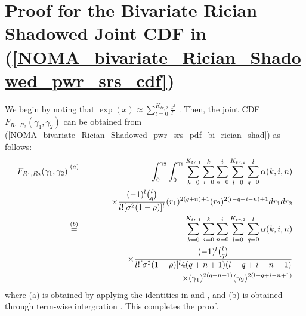 \section{Proof for the Bivariate Rician Shadowed Joint CDF in (\ref{NOMA_bivariate_Rician_Shadowed_pwr_srs_cdf})} \label{NOMA_bivariate_Rician_Shadowed_cdf_lemma_proof}
We begin by noting that $\exp(x) \approx \sum_{l=0}^{K_{tr,2}} \frac{x^l}{l!}$ \cite[eq. (1.211.1)]{gradshteyn2014table}. Then, the joint CDF $F_{R_1,R_2}(\gamma_1,\gamma_2)$ can be obtained from (\ref{NOMA_bivariate_Rician_Shadowed_pwr_srs_pdf_bi_rician_shad}) as follows:
\begin{eqnarray}
F_{R_1,R_2}(\gamma_1,\gamma_2) & \eqa & \int_{0}^{\gamma_2} \int_{0}^{\gamma_1} \sum_{k=0}^{K_{tr,1}} \sum_{i=0}^{k} \sum_{n=0}^{i} \sum_{l=0}^{K_{tr,2}} \sum_{q=0}^{l} \alpha(k,i,n) \nonumber \\
 & & \hspace{0cm} \times \frac{(-1)^{l} \binom{l}{q}}{l![\sigma^2 (1-\rho)]^l} (r_1)^{2(q+n)+1} (r_2)^{2(l-q+i-n)+1} dr_1 dr_2 \nonumber \\
 & \eqb & \sum_{k=0}^{K_{tr,1}} \sum_{i=0}^{k} \sum_{n=0}^{i} \sum_{l=0}^{K_{tr,2}} \sum_{q=0}^{l} \alpha(k,i,n) \nonumber \\
 & & \hspace{0cm} \times \frac{(-1)^{l} \binom{l}{q}}{l![\sigma^2 (1-\rho)]^l 4 (q+n+1)(l-q+i-n+1)} \nonumber \\
 & & \hspace{4cm} \times (\gamma_1)^{2(q+n+1)} (\gamma_2)^{2(l-q+i-n+1)} \label{NOMA_bivariate_Rician_Shadowed_proof_pwr_srs_cdf_bi_rician_shad}
\end{eqnarray}
where (a) is obtained by applying the identities in \cite[eq. (1.211.1)]{gradshteyn2014table} and \cite[eq. (1.111)]{gradshteyn2014table}, and (b) is obtained through term-wise intergration \cite{amann2005analysis,gradshteyn2014table}. This completes the proof.

